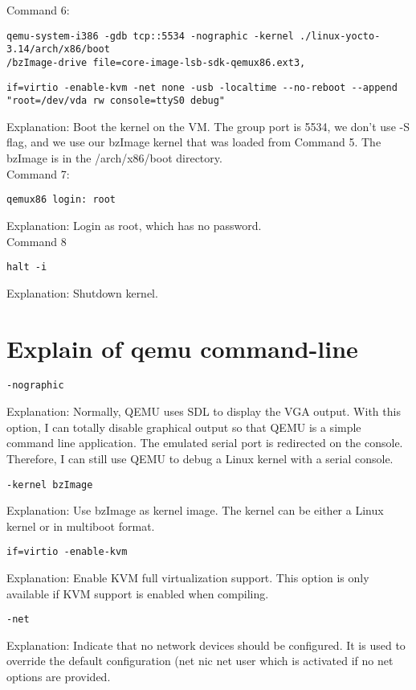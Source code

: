 \documentclass[10pt,draftclsnofoot,peerreview,letterpaper,onecolumn,]{IEEEtran}
\begin{document}
Command 6:
\begin{verbatim}
qemu-system-i386 -gdb tcp::5534 -nographic -kernel ./linux-yocto-3.14/arch/x86/boot
/bzImage-drive file=core-image-lsb-sdk-qemux86.ext3,
\end{verbatim}
\begin{verbatim}
if=virtio -enable-kvm -net none -usb -localtime --no-reboot --append
"root=/dev/vda rw console=ttyS0 debug"
\end{verbatim}
Explanation: Boot the kernel on the VM. The group port is 5534, we don't use -S flag, and we use our bzImage kernel that was loaded from Command 5.
The bzImage is in the /arch/x86/boot directory.\\

Command 7:
\begin{verbatim}
qemux86 login: root
\end{verbatim}
Explanation: Login as root, which has no password.\\

Command 8
\begin{verbatim}
halt -i
\end{verbatim}
Explanation: Shutdown kernel.\\


\newpage
\section{Explain of qemu command-line}
\begin{verbatim}
-nographic
\end{verbatim}
Explanation: Normally, QEMU uses SDL to display the VGA output. With this option, I can totally disable graphical output so that QEMU is a simple command line application. The emulated serial port is redirected on the console. Therefore, I can still use QEMU to debug a Linux kernel with a serial console.

\begin{verbatim}
-kernel bzImage
\end{verbatim}
Explanation: Use bzImage as kernel image. The kernel can be either a Linux kernel or in multiboot format.

\begin{verbatim}
if=virtio -enable-kvm
\end{verbatim}
Explanation: Enable KVM full virtualization support. This option is only available if KVM support is enabled when compiling.

\begin{verbatim}
-net
\end{verbatim}
Explanation: Indicate that no network devices should be configured. It is used to override the default configuration (\-net nic \-net user which is activated if no \-net options are provided.
\end{document}

